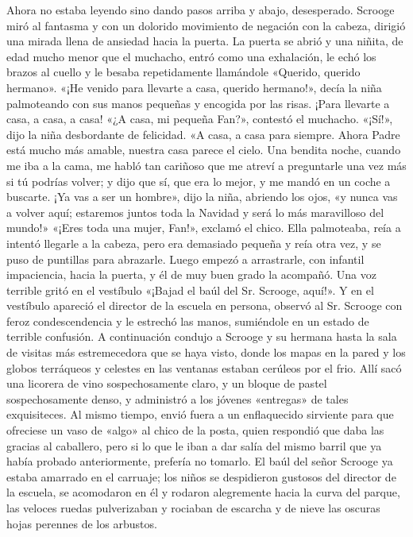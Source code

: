 \documentclass{novela}
\begin{document}
 Ahora no estaba leyendo sino dando pasos arriba y abajo, desesperado. Scrooge miró al fantasma y con un dolorido movimiento de negación con la cabeza, dirigió una mirada llena de ansiedad hacia la puerta. La puerta se abrió y una niñita, de edad mucho menor que el muchacho, entró como una exhalación, le echó los brazos al cuello y le besaba repetidamente llamándole «Querido, querido hermano».
 «¡He venido para llevarte a casa, querido hermano!», decía la niña palmoteando con sus manos pequeñas y encogida por las risas. ¡Para llevarte a casa, a casa, a casa!
 «¿A casa, mi pequeña Fan?», contestó el muchacho.
 «¡Sí!», dijo la niña desbordante de felicidad. «A casa, a casa para siempre. Ahora Padre está mucho más amable, nuestra casa parece el cielo. Una bendita noche, cuando me iba a la cama, me habló tan cariñoso que me atreví a preguntarle una vez más si tú podrías volver; y dijo que sí, que era lo mejor, y me mandó en un coche a buscarte. ¡Ya vas a ser un hombre», dijo la niña, abriendo los ojos, «y nunca vas a volver aquí; estaremos juntos toda la Navidad y será lo más maravilloso del mundo!»
 «¡Eres toda una mujer, Fan!», exclamó el chico.
 Ella palmoteaba, reía a intentó llegarle a la cabeza, pero era demasiado pequeña y reía otra vez, y se puso de puntillas para abrazarle. Luego empezó a arrastrarle, con infantil impaciencia, hacia la puerta, y él de muy buen grado la acompañó.
 Una voz terrible gritó en el vestíbulo «¡Bajad el baúl del Sr. Scrooge, aquí!». Y en el vestíbulo apareció el director de la escuela en persona, observó al Sr. Scrooge con feroz condescendencia y le estrechó las manos, sumiéndole en un estado de terrible confusión. A continuación condujo a Scrooge y su hermana hasta la sala de visitas más estremecedora que se haya visto, donde los mapas en la pared y los globos terráqueos y celestes en las ventanas estaban cerúleos por el frio. Allí sacó una licorera de vino sospechosamente claro, y un bloque de pastel sospechosamente denso, y administró a los jóvenes «entregas» de tales exquisiteces. Al mismo tiempo, envió fuera a un enflaquecido sirviente para que ofreciese un vaso de «algo» al chico de la posta, quien respondió que daba las gracias al caballero, pero si lo que le iban a dar salía del mismo barril que ya había probado anteriormente, prefería no tomarlo. El baúl del señor Scrooge ya estaba amarrado en el carruaje; los niños se despidieron gustosos del director de la escuela, se acomodaron en él y rodaron alegremente hacia la curva del parque, las veloces ruedas pulverizaban y rociaban de escarcha y de nieve las oscuras hojas perennes de los arbustos.
\end{document}
